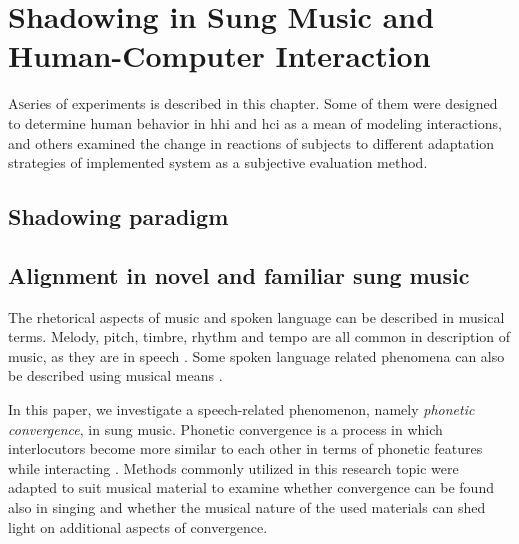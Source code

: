 \chapter{Shadowing in Sung Music and Human-Computer Interaction}
\label{chap:shadowing_in_sung_music_and_human_computer_interaction}

\lettrine{A} series of experiments is described in this chapter.
Some of them were designed to determine human behavior in \acl{hhi} and \ac{hci} as a mean of modeling interactions, and others examined the change in reactions of subjects to different adaptation strategies of implemented system as a subjective evaluation method.

\pagebreak

\section{Shadowing paradigm}
\label{sec:shadowing_paradigm}


\section{Alignment in novel and familiar sung music}
\label{sec:alignment_in_novel_and_familiar_sung_music}


The rhetorical aspects of music and spoken language can be described in musical terms.
Melody, pitch, timbre, rhythm and tempo are all common in description of music, as they are in speech \citep{Molino2000toward, Jackendoff2009parallels}.
Some spoken language related phenomena can also be described using musical means \citep[as in][]{Day2013speech}.

In this paper, we investigate a speech-related phenomenon, namely \emph{phonetic convergence}, in sung music.
Phonetic convergence is a process in which interlocutors become more similar to each other in terms of phonetic features while interacting \citep{Pardo2006phonetic, Kim2011phonetic}.
Methods commonly utilized in this research topic were adapted to suit musical material to examine whether convergence can be found also in singing and whether the musical nature of the used materials can shed light on additional aspects of convergence.

